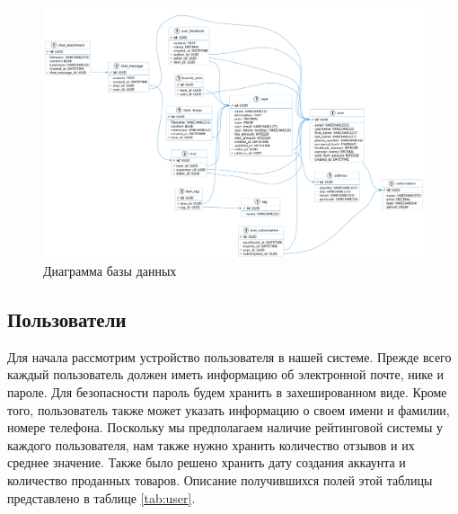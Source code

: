 \documentclass[a4paper,14pt]{extarticle}
\begin{document}
\begin{figure}[H]
    \centering
    \includegraphics[width=\textwidth]{images/db.png}
    \caption{Диаграмма базы данных}
    \label{fig:db}
\end{figure}

\subsection{Пользователи}

Для начала рассмотрим устройство пользователя в нашей системе. Прежде всего каждый пользователь должен иметь информацию об электронной почте, нике и пароле. Для безопасности пароль будем хранить в захешированном виде. Кроме того, пользователь также может указать информацию о своем имени и фамилии, номере телефона. Поскольку мы предполагаем наличие рейтинговой системы у каждого пользователя, нам также нужно хранить количество отзывов и их среднее значение. Также было решено хранить дату создания аккаунта и количество проданных товаров. Описание получившихся полей этой таблицы представлено в таблице \ref{tab:user}.
\end{document}
